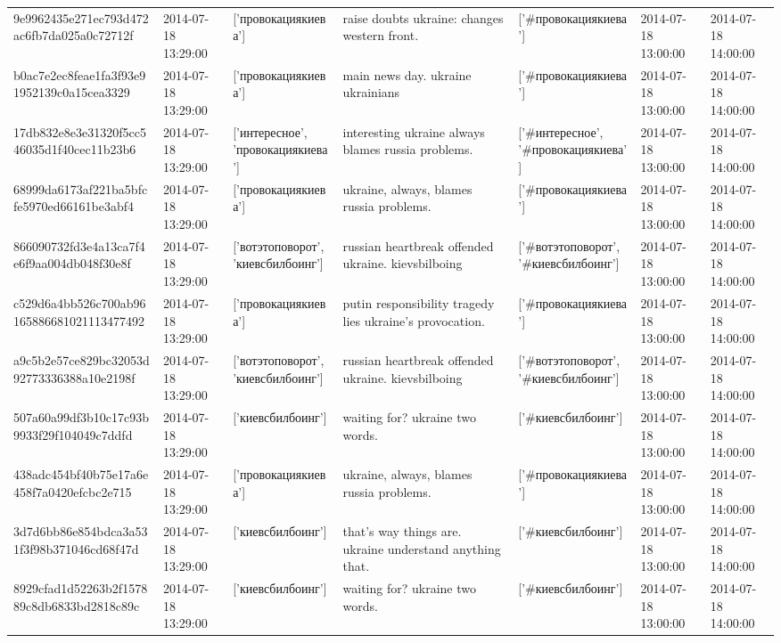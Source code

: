 \begin{tabular}{lllllll}
9e9962435e271ec793d472ac6fb7da025a0c72712f & 2014-07-18 13:29:00 & ['провокациякиева'] & raise doubts ukraine: changes western front. & ['#провокациякиева'] & 2014-07-18 13:00:00 & 2014-07-18 14:00:00 \\
b0ac7e2ec8feae1fa3f93e91952139c0a15cea3329 & 2014-07-18 13:29:00 & ['провокациякиева'] & main news day. ukraine ukrainians & ['#провокациякиева'] & 2014-07-18 13:00:00 & 2014-07-18 14:00:00 \\
17db832e8e3e31320f5cc546035d1f40cec11b23b6 & 2014-07-18 13:29:00 & ['интересное', 'провокациякиева'] & interesting ukraine always blames russia problems. & ['#интересное', '#провокациякиева'] & 2014-07-18 13:00:00 & 2014-07-18 14:00:00 \\
68999da6173af221ba5bfcfe5970ed66161be3abf4 & 2014-07-18 13:29:00 & ['провокациякиева'] & ukraine, always, blames russia problems. & ['#провокациякиева'] & 2014-07-18 13:00:00 & 2014-07-18 14:00:00 \\
866090732fd3e4a13ca7f4e6f9aa004db048f30e8f & 2014-07-18 13:29:00 & ['вотэтоповорот', 'киевсбилбоинг'] & russian heartbreak offended ukraine. kievsbilboing & ['#вотэтоповорот', '#киевсбилбоинг'] & 2014-07-18 13:00:00 & 2014-07-18 14:00:00 \\
c529d6a4bb526c700ab96165886681021113477492 & 2014-07-18 13:29:00 & ['провокациякиева'] & putin responsibility tragedy lies ukraine's provocation. & ['#провокациякиева'] & 2014-07-18 13:00:00 & 2014-07-18 14:00:00 \\
a9c5b2e57ce829bc32053d92773336388a10e2198f & 2014-07-18 13:29:00 & ['вотэтоповорот', 'киевсбилбоинг'] & russian heartbreak offended ukraine. kievsbilboing & ['#вотэтоповорот', '#киевсбилбоинг'] & 2014-07-18 13:00:00 & 2014-07-18 14:00:00 \\
507a60a99df3b10c17c93b9933f29f104049c7ddfd & 2014-07-18 13:29:00 & ['киевсбилбоинг'] & waiting for? ukraine two words. & ['#киевсбилбоинг'] & 2014-07-18 13:00:00 & 2014-07-18 14:00:00 \\
438adc454bf40b75e17a6e458f7a0420efcbc2e715 & 2014-07-18 13:29:00 & ['провокациякиева'] & ukraine, always, blames russia problems. & ['#провокациякиева'] & 2014-07-18 13:00:00 & 2014-07-18 14:00:00 \\
3d7d6bb86e854bdca3a531f3f98b371046cd68f47d & 2014-07-18 13:29:00 & ['киевсбилбоинг'] & that's way things are. ukraine understand anything that. & ['#киевсбилбоинг'] & 2014-07-18 13:00:00 & 2014-07-18 14:00:00 \\
8929cfad1d52263b2f157889c8db6833bd2818c89c & 2014-07-18 13:29:00 & ['киевсбилбоинг'] & waiting for? ukraine two words. & ['#киевсбилбоинг'] & 2014-07-18 13:00:00 & 2014-07-18 14:00:00 \\

\end{tabular}
